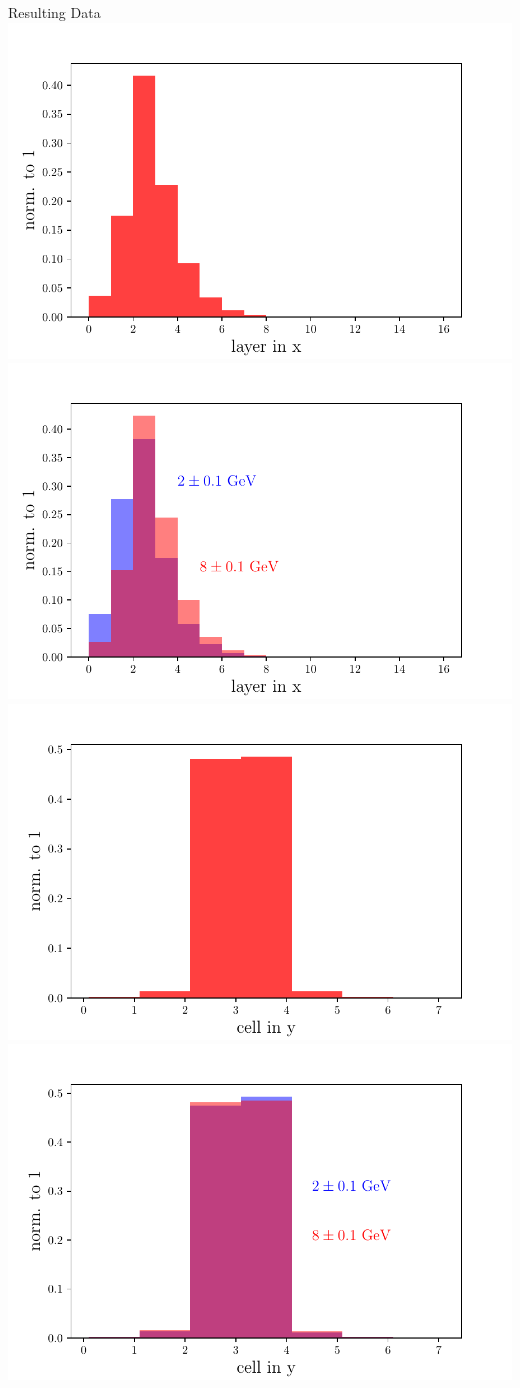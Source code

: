 \documentclass[10pt]{beamer}
\begin{document}
\begin{frame}{Resulting Data}
  \includegraphics[width=0.49 \textwidth]{../images/x_distribution.pdf}
  \includegraphics[width=0.49 \textwidth]{../images/x_e28_distribution.pdf}
  \includegraphics[width=0.49 \textwidth]{../images/y_distribution.pdf}
  \includegraphics[width=0.49 \textwidth]{../images/y_e28_distribution.pdf}
\end{frame}
\end{document}

